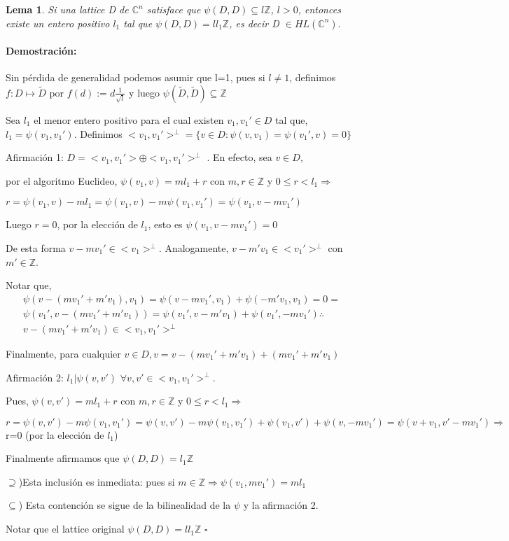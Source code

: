 \documentclass[12pt]{article}
\newtheorem{lemma}{Lema}
\newenvironment{proof}{\paragraph{Demostración:}}{\hfill$\square$}
\begin{document}
\begin{lemma} \label{1.7}
 Si una lattice D de $\mathbb{C}^n$  satisface que $\psi(D,D) \subseteq  l \mathbb{Z}$, $l>0$, entonces 
 existe un entero positivo $l_1$ tal que $\psi (D,D)=l l_1 \mathbb{Z}$, es decir D $\in HL(\mathbb{C}^{n}).$
\end{lemma}
\begin{proof}
 Sin pérdida de generalidad podemos asumir que l=1, pues si $l\neq1$, definimos  
 $f:D\mapsto \tilde{D}$ por $f(d):=d\frac{1}{\sqrt{l}}$
y luego $\psi (\tilde{D},\tilde{D})\subseteq \mathbb{Z}$
 
Sea $l_1$ el menor entero positivo para el cual existen $
v_1,v_1' \in D$ tal que, $l_1=\psi (v_1,v_1')$.
 Definimos $<v_1,v_1'>^\bot=\{v \in D: \psi(v,v_1)=\psi(v_1',v)=0\}$
 \newline
 
 Afirmación 1: $D=<v_1,v_1'>\oplus <v_1,v_1'>^\bot$ . En efecto, sea $v \in D$,
 
 por el algoritmo Euclideo, $\psi(v_1,v)=m l_1 +r$ con $m,r \in \mathbb{Z}$ y $0 \leq r < l_1 \Rightarrow $
 
 $r=\psi(v_1,v)-m l_1=\psi(v_1,v)-m \psi(v_1,v_1')=\psi(v_1,v-mv_1')$
 
 
Luego $r=0$, por la elección de $l_1$, esto es $\psi(v_1,v-mv_1')=0$
 
 De esta forma $v-mv_1' \in <v_1>^\bot$.
 Analogamente, $v-m'v_1 \in <v_1'>^\bot$  con $m'\in \mathbb{Z}$.
 
 Notar que,
 $$\begin{aligned}
 \psi(v-(m v_1' + m' v_1),v_1)=\psi(v-m v_1',v_1) + \psi(-m' v_1,v_1)=0=\\
 \psi(v_1',v-(m v_1'+m'v_1))=\psi(v_1',v-m'v_1)+ \psi(v_1',-m v_1') \therefore \\
 v-(m v_1'+m'v_1) \in <v_1,v_1'>^\bot
 \end{aligned}$$
 
 Finalmente, para cualquier $v\in D, v=v-(m v_1'+ m'v_1)+(m v_1' + m'v_1)$ 
 \newline
  
 
 Afirmación 2: $l_1 | \psi(v,v')$ $\forall v,v' \in <v_1,v_1'>^\bot$.
 
 Pues, $\psi(v,v')=m l_1 + r$ con $m,r \in \mathbb{Z}$ y  $0\leq r < l_1 \Rightarrow $
 
 $r= \psi(v,v') - m \psi(v_1,v_1')=\psi(v,v')-m\psi(v_1,v_1')+ \psi (v_1,v')+ \psi(v,-m v_1') 
 = \psi(v+v_1,v'-mv_1') \Rightarrow $ r=0 (por la elección de $l_1$) 
 
 Finalmente afirmamos que $\psi(D,D)=l_1 \mathbb{Z}$ 
 
 $\supseteq$)Esta inclusión es inmediata: pues si $m \in \mathbb{Z} \Rightarrow \psi(v_1,m v_1') = m l_1$
 
 $\subseteq$) Esta contención se sigue de la bilinealidad de la $\psi$ y la  afirmación 2.
 
 Notar que el lattice original $\psi(D,D)= l l_1 \mathbb{Z} $
\end{proof}
\end{document}
